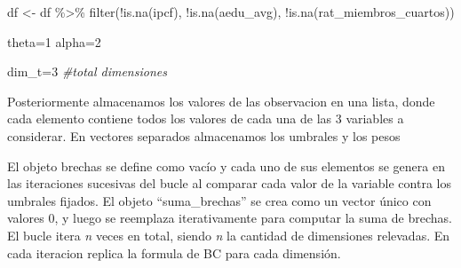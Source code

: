 \documentclass[
]{book}
\newenvironment{Shaded}{\begin{snugshade}}{\end{snugshade}}
\newcommand{\CommentTok}[1]{\textcolor[rgb]{0.56,0.35,0.01}{\textit{#1}}}
\newcommand{\DecValTok}[1]{\textcolor[rgb]{0.00,0.00,0.81}{#1}}
\newcommand{\FloatTok}[1]{\textcolor[rgb]{0.00,0.00,0.81}{#1}}
\newcommand{\FunctionTok}[1]{\textcolor[rgb]{0.00,0.00,0.00}{#1}}
\newcommand{\NormalTok}[1]{#1}
\newcommand{\OtherTok}[1]{\textcolor[rgb]{0.56,0.35,0.01}{#1}}
\newcommand{\SpecialCharTok}[1]{\textcolor[rgb]{0.00,0.00,0.00}{#1}}
\begin{document}
\begin{Shaded}
\begin{Highlighting}[]
\NormalTok{df }\OtherTok{\textless{}{-}}\NormalTok{ df }\SpecialCharTok{\%\textgreater{}\%} \FunctionTok{filter}\NormalTok{(}\SpecialCharTok{!}\FunctionTok{is.na}\NormalTok{(ipcf), }\SpecialCharTok{!}\FunctionTok{is.na}\NormalTok{(aedu\_avg), }\SpecialCharTok{!}\FunctionTok{is.na}\NormalTok{(rat\_miembros\_cuartos))}

\NormalTok{theta}\OtherTok{=}\DecValTok{1}  
\NormalTok{alpha}\OtherTok{=}\DecValTok{2}

\NormalTok{dim\_t}\OtherTok{=}\DecValTok{3}    \CommentTok{\#total dimensiones}
\end{Highlighting}
\end{Shaded}

Posteriormente almacenamos los valores de las observacion en una lista, donde cada elemento contiene todos los valores de cada una de las 3 variables a considerar. En vectores separados almacenamos los umbrales y los pesos

\begin{Shaded}
\end{Shaded}

El objeto brechas se define como vacío y cada uno de sus elementos se genera en las iteraciones sucesivas del bucle al comparar cada valor de la variable contra los umbrales fijados. El objeto ``suma\_brechas'' se crea como un vector único con valores 0, y luego se reemplaza iterativamente para computar la suma de brechas. El bucle itera \emph{n} veces en total, siendo \emph{n} la cantidad de dimensiones relevadas. En cada iteracion replica la formula de BC para cada dimensión.
\end{document}
